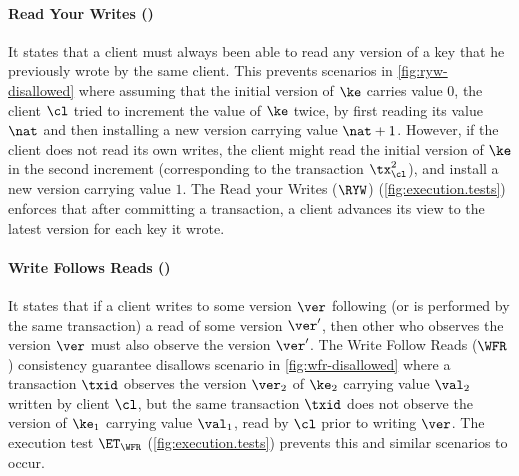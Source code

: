 \paragraph{Read Your Writes (\RYW)}
It states that a client must always been able to read any version 
of a key that he previously wrote by the same client. This prevents scenarios in \cref{fig:ryw-disallowed} where
assuming that the initial version of $\ke$ carries value $0$, the client $\cl$ tried to increment the value of $\ke$ twice, 
by first reading its value $\nat$ and then installing a new version carrying  value $\nat+1$.
However, if the client does not read its 
own writes, the client might read the initial version of $\ke$ in the second increment 
(corresponding to the transaction $\tx_{\cl}^2$), and install a new version carrying value $1$.
The Read your Writes ($\RYW$) (\cref{fig:execution.tests}) enforces that after committing a transaction, 
a client advances its view to the latest version for each key it wrote.  

\paragraph{Write Follows Reads (\WFR)}
It states that if a client writes to some version $\ver$ following (or is performed by the same transaction) 
a read of some version $\ver'$, 
then other who observes the version $\ver$ must also observe the version $\ver'$. The Write Follow Reads ($\WFR$) 
consistency guarantee disallows scenario in \cref{fig:wfr-disallowed} 
where a transaction $\txid$ observes the version $\ver_2$ of $\ke_2$ carrying value $\val_2$ written by client $\cl$,
but the same transaction $\txid$ does not observe 
the version of $\ke_1$ carrying value $\val_1$, read by $\cl$ prior to writing $\ver$. 
The execution test $\ET_{\WFR}$ (\cref{fig:execution.tests}) prevents this and similar scenarios to occur.

